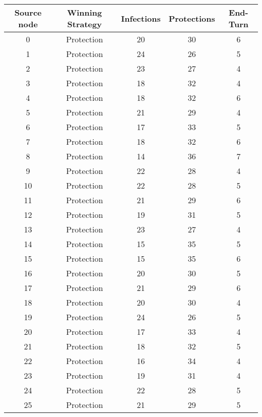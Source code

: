 \documentclass[results.tex]{subfiles}
\begin{document}
\begin{center}
  \begin{tabular}{| c || c | c | c | c |}
    \hline
    {\bfseries Source node} & {\bfseries Winning Strategy} & {\bfseries Infections} & {\bfseries Protections} & {\bfseries End-Turn} \\  %
    \hline\hline
    0 & Protection & 20 & 30 & 6 \\ 
    \hline
    1 & Protection & 24 & 26 & 5 \\ 
    \hline
    2 & Protection & 23 & 27 & 4 \\ 
    \hline
    3 & Protection & 18 & 32 & 4 \\ 
    \hline
    4 & Protection & 18 & 32 & 6 \\ 
    \hline
    5 & Protection & 21 & 29 & 4 \\ 
    \hline
    6 & Protection & 17 & 33 & 5 \\ 
    \hline
    7 & Protection & 18 & 32 & 6 \\ 
    \hline
    8 & Protection & 14 & 36 & 7 \\ 
    \hline
    9 & Protection & 22 & 28 & 4 \\ 
    \hline
    10 & Protection & 22 & 28 & 5 \\ 
    \hline
    11 & Protection & 21 & 29 & 6 \\ 
    \hline
    12 & Protection & 19 & 31 & 5 \\ 
    \hline
    13 & Protection & 23 & 27 & 4 \\ 
    \hline
    14 & Protection & 15 & 35 & 5 \\ 
    \hline
    15 & Protection & 15 & 35 & 6 \\ 
    \hline
    16 & Protection & 20 & 30 & 5 \\ 
    \hline
    17 & Protection & 21 & 29 & 6 \\ 
    \hline
    18 & Protection & 20 & 30 & 4 \\ 
    \hline
    19 & Protection & 24 & 26 & 5 \\ 
    \hline
    20 & Protection & 17 & 33 & 4 \\ 
    \hline
    21 & Protection & 18 & 32 & 5 \\ 
    \hline
    22 & Protection & 16 & 34 & 4 \\ 
    \hline
    23 & Protection & 19 & 31 & 4 \\ 
    \hline
    24 & Protection & 22 & 28 & 5 \\ 
    \hline
    25 & Protection & 21 & 29 & 5 \\ 

\end{tabular}
\end{center}
\end{document}

